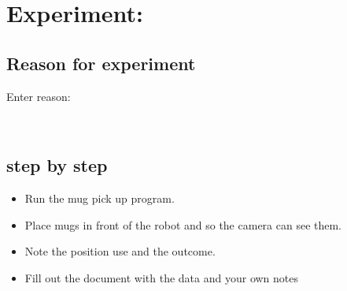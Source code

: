 \section{Experiment:}



\subsection{Reason for experiment}

\begin{Form}
Enter reason: \vspace{3mm} 

\TextField[
  name=reason,
  multiline=true,
  width=10cm,
  height=4cm
]{}

\end{Form}\\




\subsection{step by step} 
\begin{itemize}
    \item Run the mug pick up program.
    \item Place mugs in front of the robot and so the camera can see them.
    \item Note the position use and the outcome.
    \item Fill out the document with the data and your own notes
\end{itemize}
    
